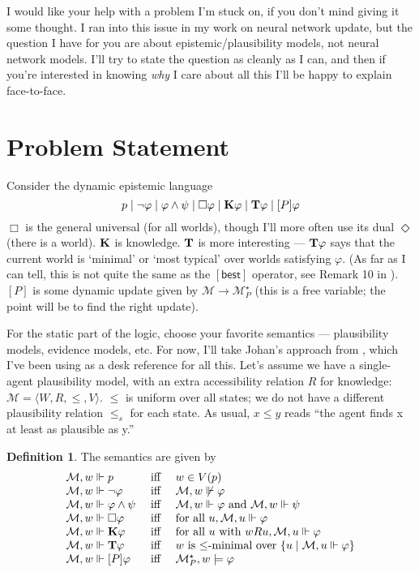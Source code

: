 \documentclass[letterpaper]{article}
\theoremstyle{definition}
\newtheorem{definition}{Definition}
\newcommand{\Model}{\mathcal{M}}
\newcommand{\set}[1]{\{ #1 \}}
\newcommand{\Typ}[1]{\textrm{\textup{\textbf{T}}} #1}
\newcommand{\Know}[1]{\textrm{\textup{\textbf{K}}} #1}
\newcommand{\KnowNoArgs}{\textrm{\textup{\textbf{K}}}}
\newcommand{\TypNoArgs}{\textrm{\textup{\textbf{T}}}}
\newcommand{\Update}[1]{[#1]}
\newcommand{\BestNoArgs}{[\mathsf{best}]}
\begin{document}
I would like your help with a problem I'm stuck on, if you don't mind giving it some thought.  I ran into this issue in my work on neural network update, but the question I have for you are about epistemic/plausibility models, not neural network models.  I'll try to state the question as cleanly as I can, and then if you're interested in knowing \emph{why} I care about all this I'll be happy to explain face-to-face.

\section*{Problem Statement}

Consider the dynamic epistemic language
\[
    p \mid \neg \varphi \mid \varphi \land \psi \mid \Box \varphi \mid \Know{\varphi} \mid \Typ{\varphi} \mid \Update{P} \varphi
\]
$\Box$ is the general universal (for all worlds), though I'll more often use its dual $\Diamond$ (there is a world). $\KnowNoArgs$ is knowledge.  $\TypNoArgs$ is more interesting --- $\Typ{\varphi}$ says that the current world is `minimal' or `most typical' over worlds satisfying $\varphi$.  (As far as I can tell, this is not quite the same as the $\BestNoArgs$ operator, see Remark 10 in \cite{van2007beliefrevision}).  $\Update{P}$ is some dynamic update given by $\Model \to \Model^\star_P$ (this is a free variable; the point will be to find the right update).  

For the static part of the logic, choose your favorite semantics --- plausibility models, evidence models, etc.  For now, I'll take Johan's approach from \cite{van2011logical}, which I've been using as a desk reference for all this.  Let's assume we have a single-agent plausibility model, with an extra accessibility relation $R$ for knowledge: $\Model = \langle W, R, \leq, V \rangle$.  $\leq$ is uniform over all states; we do not have a different plausibility relation $\leq_s$ for each state.  As usual, $x \leq y$ reads ``the agent finds x at least as plausible as y.''

\begin{definition}
    The semantics are given by
    \[
    \begin{array}{lcl}
        \Model, w \Vdash p & \mbox{ iff } & w \in V(p)\\
        \Model, w \Vdash \neg \varphi & \mbox{ iff } & \Model, w \not \Vdash \varphi\\
        \Model, w \Vdash \varphi \land \psi & \mbox{ iff } & \Model, w \Vdash \varphi \mbox{ and } \Model, w \Vdash \psi\\
        \Model, w \Vdash \Box \varphi & \mbox{ iff } & \mbox{for all } u, \Model, u \Vdash \varphi\\
        \Model, w \Vdash \Know \varphi & \mbox{ iff } & \mbox{for all } u \mbox{ with } w{R}u, \Model, u \Vdash \varphi \\
        \Model, w \Vdash \Typ{\varphi} & \mbox{ iff } & w \mbox{ is } {\leq}\mbox{-minimal over } \set{u \mid \Model, u \Vdash \varphi} \\
        \Model, w \Vdash \Update{P} \varphi & \mbox{ iff } & \Model^\star_P, w \models \varphi
    \end{array}
    \]
\end{definition}
\end{document}
